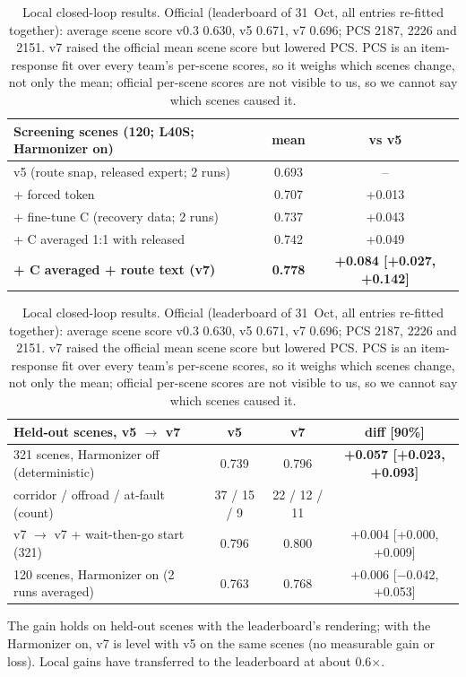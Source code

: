 \documentclass{article}
\begin{document}
\begin{table}[h]
\centering\small
\begin{tabular}{lcc}
\toprule
Screening scenes (120; L40S; Harmonizer on) & mean & vs v5 \\
\midrule
v5 (route snap, released expert; 2 runs) & 0.693 & -- \\
+ forced token & 0.707 & +0.013 \\
+ fine-tune C (recovery data; 2 runs) & 0.737 & +0.043 \\
+ C averaged 1:1 with released & 0.742 & +0.049 \\
\textbf{+ C averaged + route text (v7)} & \textbf{0.778} & \textbf{+0.084 [+0.027, +0.142]} \\
\bottomrule
\end{tabular}
\vspace{2mm}

\begin{tabular}{lccc}
\toprule
Held-out scenes, v5 $\rightarrow$ v7 & v5 & v7 & diff [90\%] \\
\midrule
321 scenes, Harmonizer off (deterministic) & 0.739 & 0.796 & \textbf{+0.057 [+0.023, +0.093]} \\
\quad corridor / offroad / at-fault (count) & 37 / 15 / 9 & 22 / 12 / 11 & \\
v7 $\rightarrow$ v7 + wait-then-go start (321) & 0.796 & 0.800 & +0.004 [+0.000, +0.009] \\
120 scenes, Harmonizer on (2 runs averaged) & 0.763 & 0.768 & +0.006 [$-$0.042, +0.053] \\
\bottomrule
\end{tabular}
\caption{Local closed-loop results. Official (leaderboard of 31~Oct, all entries re-fitted together): average
scene score v0.3 0.630, v5 0.671, v7 0.696; PCS 2187, 2226 and 2151. v7 raised the official mean scene score but
lowered PCS. PCS is an item-response fit over every team's per-scene scores, so it weighs which scenes change, not
only the mean; official per-scene scores are not visible to us, so we cannot say which scenes caused it.}
\label{tab:ladder}
\end{table}

The gain holds on held-out scenes with the leaderboard's rendering; with the Harmonizer on, v7 is level with v5 on the
same scenes (no measurable gain or loss). Local gains have transferred to the leaderboard at about 0.6$\times$.
\end{document}
